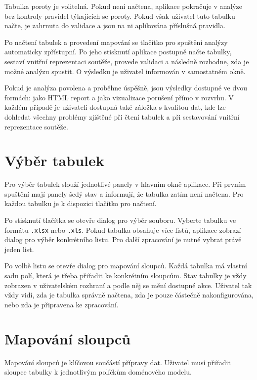 \documentclass[czech, kiv, ba, he, iso690alph, pdf]{fasthesis}
\begin{document}
			Tabulka poroty je volitelná. Pokud není načtena, aplikace pokračuje v analýze bez kontroly pravidel týkajících se poroty. Pokud však uživatel tuto tabulku načte, je zahrnuta do validace a jsou na ni aplikována příslušná pravidla.
	
			Po načtení tabulek a provedení mapování se tlačítko pro spuštění analýzy automaticky zpřístupní. Po jeho stisknutí aplikace postupně načte tabulky, sestaví vnitřní reprezentaci soutěže, provede validaci a následně rozhodne, zda je možné analýzu spustit. O výsledku je uživatel informován v samostatném okně.
	
			Pokud je analýza povolena a proběhne úspěšně, jsou výsledky dostupné ve dvou formách: jako HTML report a jako vizualizace porušení přímo v rozvrhu. V každém případě je uživateli dostupná také záložka s kvalitou dat, kde lze dohledat všechny problémy zjištěné při čtení tabulek a při sestavování vnitřní reprezentace soutěže.
	
		\section{Výběr tabulek}
	
			Pro výběr tabulek slouží jednotlivé panely v hlavním okně aplikace. Při prvním spuštění mají panely šedý stav a informují, že tabulka zatím není načtena. Pro každou tabulku je k dispozici tlačítko pro načtení.
	
			Po stisknutí tlačítka se otevře dialog pro výběr souboru. Vyberte tabulku ve formátu \texttt{.xlsx} nebo \texttt{.xls}. Pokud tabulka obsahuje více listů, aplikace zobrazí dialog pro výběr konkrétního listu. Pro další zpracování je nutné vybrat právě jeden list.
	
			Po volbě listu se otevře dialog pro mapování sloupců. Každá tabulka má vlastní sadu polí, která je třeba přiřadit ke konkrétním sloupcům. Stav tabulky je vždy zobrazen v uživatelském rozhraní a podle něj se mění dostupné akce. Uživatel tak vždy vidí, zda je tabulka správně načtena, zda je pouze částečně nakonfigurována, nebo zda je připravena ke zpracování.
	
		\section{Mapování sloupců}
	
			Mapování sloupců je klíčovou součástí přípravy dat. Uživatel musí přiřadit sloupce tabulky k jednotlivým políčkům doménového modelu.
	
\end{document}
